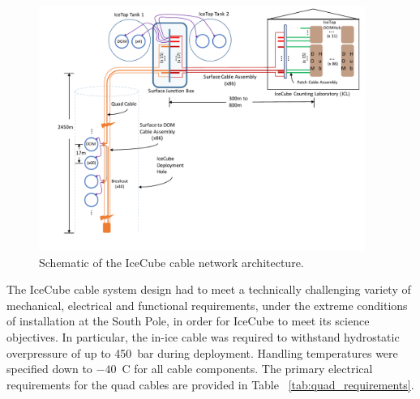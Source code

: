 \begin{figure}
  \centering
  \includegraphics[width=0.95\textwidth]{graphics/cables/cable_system_schematic.pdf}
  \caption{\label{fig:icecube-cables-logical}Schematic of the IceCube cable network architecture.}
\end{figure}

The IceCube cable system design had to meet a technically challenging
variety of mechanical, electrical and functional requirements, under the extreme
conditions of installation at the South Pole, in order for
IceCube to meet its science objectives.  In particular, the in-ice cable
was required to withstand hydrostatic overpressure of up to 450~bar during
deployment.  Handling temperatures were specified down to $-40$~C for all 
cable components.  The primary electrical requirements for the quad
cables are provided in Table ~\ref{tab:quad_requirements}.

